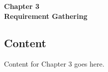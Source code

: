 
\titleformat{\chapter}[block]{\normalfont}{}{0pt}{}
\titlespacing{\chapter}{0pt}{-2em}{0pt}
\chapter[Requirement Gathering]{}
\vspace*{\fill}
\begin{center}
\textbf{\Huge{Chapter 3}}\\
\vspace{5mm}
\textbf{\Huge{Requirement Gathering}}
\end{center}
\vspace*{\fill}
\newpage

\titleformat{\chapter}[display]{\vspace{1cm}\normalfont\Large\bfseries\centering}{\chaptertitlename\ \thechapter}{20pt}{\vspace{0pt}}
\titlespacing*{\chapter}{0pt}{-50pt}{20pt}

\section{Content}
\justify

Content for Chapter 3 goes here.

